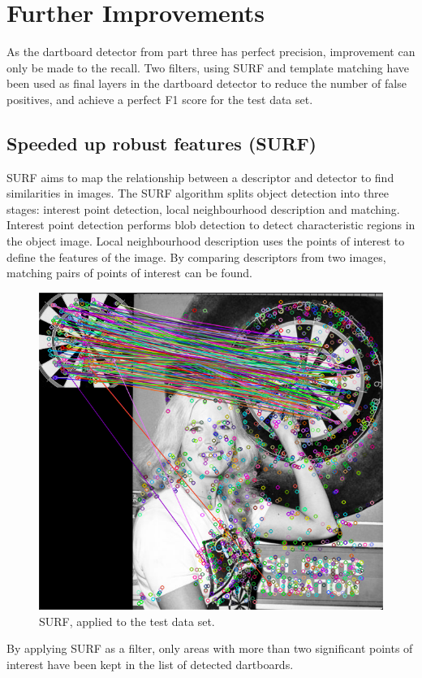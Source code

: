 \documentclass[conference]{IEEEtran}
\begin{document}
\newpage
\section{Further Improvements}
As the dartboard detector from part three has perfect precision, improvement can only be made to the recall. Two filters, using SURF and template matching have been used as final layers in the dartboard detector to reduce the number of false positives, and achieve a perfect F1 score for the test data set. 
\par
\subsection{Speeded up robust features (SURF)}
SURF aims to map the relationship between a descriptor and detector to find similarities in images. The SURF algorithm splits object detection into three stages: interest point detection, local neighbourhood description and matching. Interest point detection performs blob detection to detect characteristic regions in the object image. Local neighbourhood description uses the points of interest to define the features of the image. By comparing descriptors from two images, matching pairs of points of interest can be found. 
\par

\begin{figure}[!htb]
\begin{center}
\includegraphics[width=0.8\linewidth]{images/SURF.png}
\caption{SURF, applied to the test data set. }
\label{default}
\end{center}
\end{figure}
\par
By applying SURF as a filter, only areas with more than two significant points of interest have been kept in the list of detected dartboards.
\end{document}
